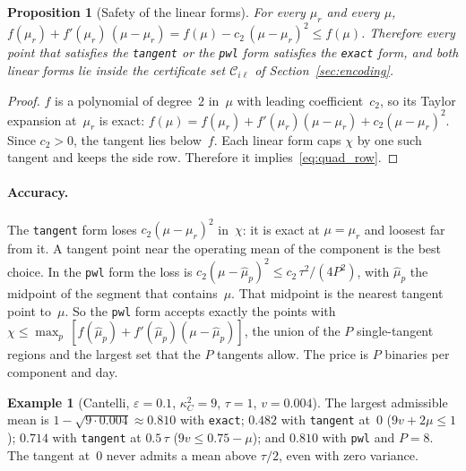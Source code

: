 \documentclass[11pt,a4paper]{article}
\theoremstyle{plain}
\newtheorem{proposition}[theorem]{Proposition}
\theoremstyle{definition}
\newtheorem{example}[theorem]{Example}
\theoremstyle{remark}
\begin{document}
\begin{proposition}[Safety of the linear forms]\label{prop:tangent_safe}
For every $\mu_r$ and every $\mu$, $f(\mu_r) + f'(\mu_r)\,(\mu - \mu_r) = f(\mu) - c_2\,(\mu - \mu_r)^2 \le f(\mu)$.
Therefore every point that satisfies the \texttt{tangent} or the \texttt{pwl} form satisfies the \texttt{exact} form, and both linear forms lie inside the certificate set $\mathcal{C}_{i\ell}$ of Section~\ref{sec:encoding}.
\end{proposition}
\begin{proof}
$f$ is a polynomial of degree~$2$ in~$\mu$ with leading coefficient~$c_2$, so its Taylor expansion at~$\mu_r$ is exact: $f(\mu) = f(\mu_r) + f'(\mu_r)(\mu - \mu_r) + c_2(\mu - \mu_r)^2$.
Since $c_2 > 0$, the tangent lies below~$f$.
Each linear form caps $\chi$ by one such tangent and keeps the side row.
Therefore it implies~\eqref{eq:quad_row}.
\end{proof}

\paragraph{Accuracy.}
The \texttt{tangent} form loses $c_2(\mu - \mu_r)^2$ in~$\chi$: it is exact at $\mu = \mu_r$ and loosest far from it.
A tangent point near the operating mean of the component is the best choice.
In the \texttt{pwl} form the loss is $c_2(\mu - \hat\mu_p)^2 \le c_2\,\tau^2/(4P^2)$, with $\hat\mu_p$ the midpoint of the segment that contains~$\mu$.
That midpoint is the nearest tangent point to~$\mu$.
So the \texttt{pwl} form accepts exactly the points with $\chi \le \max_p\, [f(\hat\mu_p) + f'(\hat\mu_p)(\mu - \hat\mu_p)]$, the union of the $P$ single-tangent regions and the largest set that the $P$ tangents allow.
The price is $P$ binaries per component and day.

\begin{example}[Cantelli, $\varepsilon = 0.1$, $\kappa_C^2 = 9$, $\tau = 1$, $v = 0.004$]
The largest admissible mean is $1 - \sqrt{9 \cdot 0.004} \approx 0.810$ with \texttt{exact}; $0.482$ with \texttt{tangent} at~$0$ ($9v + 2\mu \le 1$); $0.714$ with \texttt{tangent} at $0.5\,\tau$ ($9v \le 0.75 - \mu$); and $0.810$ with \texttt{pwl} and $P = 8$.
The tangent at~$0$ never admits a mean above $\tau/2$, even with zero variance.
\end{example}
\end{document}
